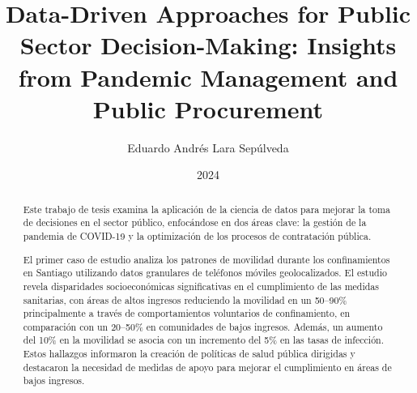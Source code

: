 \documentclass[upright, contnum]{umemoriaENG}
\author{Eduardo Andrés Lara Sepúlveda}
\title{Data-Driven Approaches for Public Sector Decision-Making: Insights from Pandemic Management and Public Procurement}
\date{2024}
\begin{document}
\frontmatter
\maketitle

\begin{abstract}





Este trabajo de tesis examina la aplicación de la ciencia de datos para mejorar la toma de decisiones en el sector público, enfocándose en dos áreas clave: la gestión de la pandemia de COVID-19 y la optimización de los procesos de contratación pública.

El primer caso de estudio analiza los patrones de movilidad durante los confinamientos en Santiago utilizando datos granulares de teléfonos móviles geolocalizados. El estudio revela disparidades socioeconómicas significativas en el cumplimiento de las medidas sanitarias, con áreas de altos ingresos reduciendo la movilidad en un 50–90\% principalmente a través de comportamientos voluntarios de confinamiento, en comparación con un 20–50\% en comunidades de bajos ingresos. Además, un aumento del 10\% en la movilidad se asocia con un incremento del 5\% en las tasas de infección. Estos hallazgos informaron la creación de políticas de salud pública dirigidas y destacaron la necesidad de medidas de apoyo para mejorar el cumplimiento en áreas de bajos ingresos.


\end{abstract}
\end{document}
